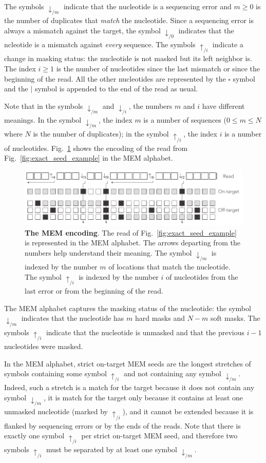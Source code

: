 \documentclass{article}
\begin{document}
The symbols $\downarrow_{/m}$ indicate that the nucleotide is a sequencing
error and $m \geq 0$ is the number of duplicates that \emph{match} the
nucleotide. Since a sequencing error is always a mismatch against the
target, the symbol $\downarrow_{/0}$ indicates that the ncleotide is a
mismatch against \emph{every} sequence. The symbols $\uparrow_{/i}$
indicate a change in masking status: the nucleotide is not masked but its
left neighbor is. The index $i \geq 1$ is the number of nucleotides since
the last mismatch or since the beginning of the read. All the other
nucleotides are represented by the $\square$ symbol and the $|$ symbol is
appended to the end of the read as usual.

Note that in the symbols $\downarrow_{/m}$ and $\downarrow_{/i}$, the
numbers $m$ and $i$ have different meanings. In the symbol
$\downarrow_{/m}$, the index $m$ is a number of sequences ($0 \leq m \leq
N$ where $N$ is the number of duplicates); in the symbol $\uparrow_{/i}$,
the index $i$ is a number of nucleotides. Fig.~\ref{fig:sketch_extended}
shows the encoding of the read from Fig.~\ref{fig:exact_seed_example} in
the MEM alphabet.

\begin{figure}[h]
\centering
\includegraphics[scale=.84]{sketch_extended.pdf}
\caption{\textbf{The MEM encoding}.
The read of Fig.~\ref{fig:exact_seed_example} is represented in the MEM
alphabet. The arrows departing from the numbers help understand their
meaning. The symbol $\downarrow_{/m}$ is indexed by the number $m$ of
locations that match the nucleotide. The symbol $\uparrow_{/i}$ is
indexed by the number $i$ of nucleotides from the last error or from the
beginning of the read.}
\label{fig:sketch_extended}
\end{figure}

The MEM alphabet captures the masking status of the nucleotide: the symbol
$\downarrow_{/m}$ indicates that the nucleotide has $m$ hard masks and
$N-m$ soft masks. The symbols $\uparrow_{/i}$ indicate that the nucleotide
is unmasked and that the previous $i-1$ nucleotides were masked.

In the MEM alphabet, strict on-target MEM seeds are the longest stretches
of symbols containing some symbol $\uparrow_{/i}$ and not containing any
symbol $\downarrow_{/m}$. Indeed, such a stretch is a match for the target
because it does not contain any symbol $\downarrow_{/m}$, it is match for
the target only because it contains at least one unmasked nucleotide
(marked by $\uparrow_{/i}$), and it cannot be extended because it is
flanked by sequencing errors or by the ends of the reads. Note that there
is exactly one symbol $\uparrow_{/i}$ per strict on-target MEM seed, and
therefore two symbols $\uparrow_{/i}$ must be separated by at least one
symbol $\downarrow_{/m}$.
\end{document}
